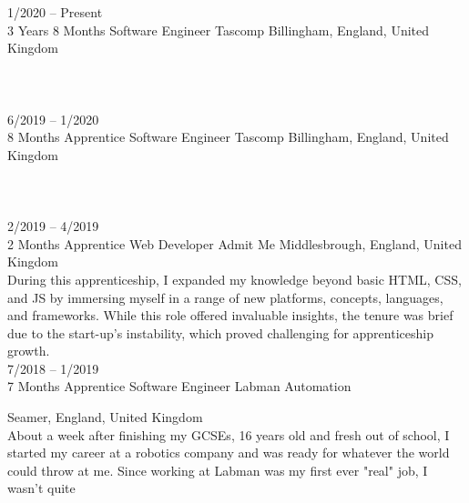\documentclass[9pt]{developercv} %
\begin{document}
\begin{entrylist}
	\entry
		{1/2020 -- Present\\3 Years 8 Months}
		{Software Engineer}
		{Tascomp}
		{Billingham, England, United Kingdom\\
		
		\lorem \lorem \lorem \lorem \lorem\\ %
		
		\\
		}\\
	\entry
		{6/2019 -- 1/2020\\8 Months}
		{Apprentice Software Engineer}
		{Tascomp}
		{Billingham, England, United Kingdom\\
		
		\lorem \lorem \lorem \lorem \lorem\\ %
		
		\\
		}\\
	\entry
		{2/2019 -- 4/2019\\2 Months}
		{Apprentice Web Developer}
		{Admit Me}
		{Middlesbrough, England, United Kingdom\\ 
		
		During this apprenticeship, I expanded my knowledge beyond basic HTML, CSS, and JS by immersing myself in a range of new platforms, concepts, languages, and frameworks. While this role offered invaluable insights, the tenure was brief due to the start-up's instability, which proved challenging for apprenticeship growth.
		}\\
	\entry
		{7/2018 -- 1/2019\\7 Months}
		{Apprentice Software Engineer}
		{Labman Automation}
		{Seamer, England, United Kingdom\\ 
		
		About a week after finishing my GCSEs, 16 years old and fresh out of school, I started my career at a robotics company and was ready for whatever the world could throw at me. Since working at Labman was my first ever "real" job, I wasn't quite 
		
		\\
		}\\
\end{entrylist}
\end{document}
